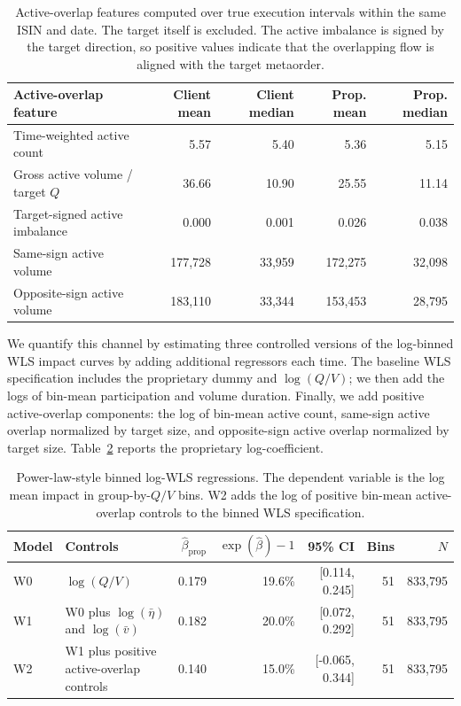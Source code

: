 \documentclass[11pt]{article}
\begin{document}
\begin{table}[t]
\centering
\scriptsize
\setlength{\tabcolsep}{4pt}
\begin{tabular}{@{}lrrrr@{}}
\toprule
Active-overlap feature & Client mean & Client median & Prop. mean & Prop. median \\
\midrule
Time-weighted active count & 5.57 & 5.40 & 5.36 & 5.15 \\
Gross active volume / target \(Q\) & 36.66 & 10.90 & 25.55 & 11.14 \\
Target-signed active imbalance & 0.000 & 0.001 & 0.026 & 0.038 \\
Same-sign active volume & 177{,}728 & 33{,}959 & 172{,}275 & 32{,}098 \\
Opposite-sign active volume & 183{,}110 & 33{,}344 & 153{,}453 & 28{,}795 \\
\bottomrule
\end{tabular}
\caption{Active-overlap features computed over true execution intervals within
the same ISIN and date. The target itself is excluded. The active imbalance is
signed by the target direction, so positive values indicate that the overlapping
flow is aligned with the target metaorder.}
\label{tab:active_overlap_summary}
\end{table}

We quantify this channel by estimating three controlled versions of the
log-binned WLS impact curves by adding additional regressors each time. The
baseline WLS specification includes the proprietary dummy and \(\log(Q/V)\); we
then add the logs of bin-mean participation and volume duration. Finally, we add
positive active-overlap components: the log of bin-mean active count, same-sign
active overlap normalized by target size, and opposite-sign active overlap
normalized by target size. Table~\ref{tab:active_overlap_wls_regression} reports
the proprietary log-coefficient.

\begin{table}[t]
\centering
\scriptsize
\setlength{\tabcolsep}{3pt}
\begin{tabular}{@{}lp{}rrrrr@{}}
\toprule
Model & Controls & \(\hat\beta_{\mathrm{prop}}\) & \(\exp(\hat\beta)-1\) & 95\% CI & Bins & \(N\) \\
\midrule
W0 & \(\log(Q/V)\) & 0.179 & 19.6\% & [0.114, 0.245] & 51 & 833{,}795 \\
W1 & W0 plus \(\log(\bar\eta)\) and \(\log(\bar v)\) & 0.182 & 20.0\% & [0.072, 0.292] & 51 & 833{,}795 \\
W2 & W1 plus positive active-overlap controls & 0.140 & 15.0\% & [-0.065, 0.344] & 51 & 833{,}795 \\
\bottomrule
\end{tabular}
\caption{Power-law-style binned log-WLS regressions. The dependent variable is
the log mean impact in group-by-\(Q/V\) bins. W2 adds the log of positive
bin-mean active-overlap controls to the binned WLS specification.}
\label{tab:active_overlap_wls_regression}
\end{table}
\end{document}
